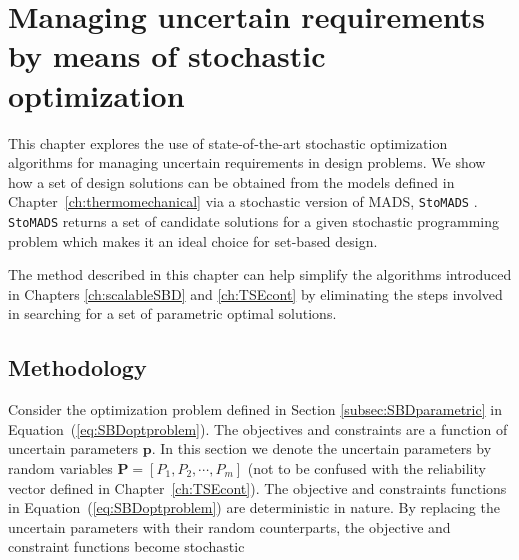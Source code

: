 \chapter{Managing uncertain requirements by means of stochastic optimization}
\label{ch:stohasticopt}

This chapter explores the use of state-of-the-art stochastic optimization algorithms for managing uncertain requirements in design problems. We show how a set of design solutions can be obtained from the models defined in Chapter~\ref{ch:thermomechanical} via a stochastic version of \ac{MADS}, \texttt{StoMADS} \cite{Audet2019}. {\color{red}\texttt{StoMADS} returns a set of candidate solutions for a given stochastic programming problem which makes it an ideal choice for set-based design.}

The method described in this chapter can help simplify the algorithms introduced in Chapters \ref{ch:scalableSBD} and \ref{ch:TSEcont} by eliminating the steps involved in searching for a set of parametric optimal solutions.

\section{Methodology} \label{sec:STOmethods}

Consider the optimization problem defined in Section \ref{subsec:SBDparametric} in Equation~(\ref{eq:SBDoptproblem}). The objectives and constraints are a function of uncertain parameters $\mathbf{p}$. In this section we denote the uncertain parameters by random variables $\mathbf{P} = \left[P_1,P_2,\cdots,P_m\right]$ (not to be confused with the reliability vector defined in Chapter~\ref{ch:TSEcont}). The objective and constraints functions in Equation~(\ref{eq:SBDoptproblem}) are deterministic in nature. By replacing the uncertain parameters with their random counterparts, the objective and constraint functions become stochastic

